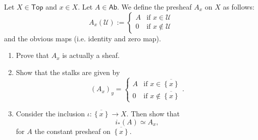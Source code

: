 \documentclass[../Main]{subfiles}
\begin{document}
\begin{exr}
	Let $X \in \mathsf{Top}$ and $x \in X$.
	Let $A \in \mathsf{Ab}$.
	We define the presheaf $A_x$ on $X$ as follows:
	\begin{equation}
		A_x(\mathcal{U}) :=
		\begin{cases}
			A & \text{if } x \in \mathcal{U}\\
			0 & \text{if } x \notin \mathcal{U}
		\end{cases} 
	\end{equation} 
	and the obvious maps (i.e. identity and zero map).
	\begin{enumerate}
		\item Prove that $A_x$ is actually a sheaf.
		\item Show that the stalks are given by
			\begin{equation}
				\left( A_x \right)_y =
				\begin{cases}
					A & \text{if } x \in \overline{\left\{ x \right\}} \\
					0 & \text{if } x \notin \overline{\left\{ x \right\}}
				\end{cases} 
			.\end{equation} 
		\item Consider the inclusion $\iota\colon \overline{\left\{ x \right\}} \to X$.
			Then show that
			\begin{equation}
				i_*(A) \simeq A_x
			,\end{equation} 
			for $A$ the constant presheaf on $\overline{\left\{ x \right\}}$.
	\end{enumerate}
\end{exr} 
\end{document}
